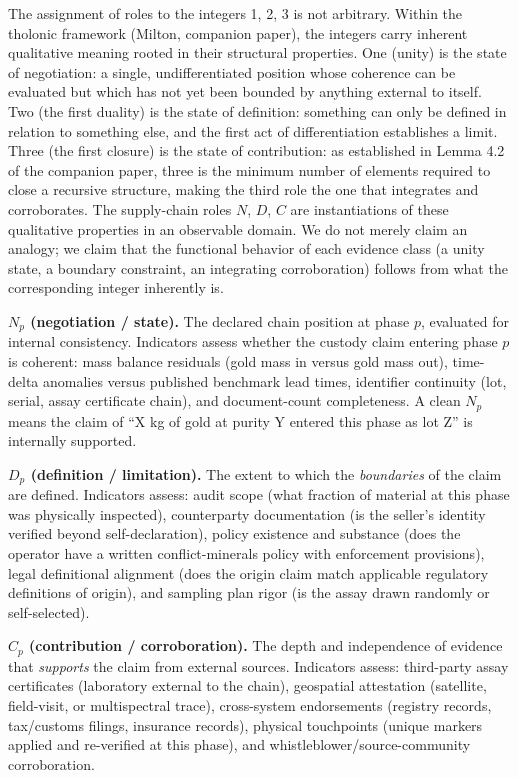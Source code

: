 \documentclass[
  11pt,
  letterpaper,
]{article}
\begin{document}
The assignment of roles to the integers 1, 2, 3 is not arbitrary. Within
the tholonic framework (Milton, companion paper), the integers carry
inherent qualitative meaning rooted in their structural properties. One
(unity) is the state of negotiation: a single, undifferentiated position
whose coherence can be evaluated but which has not yet been bounded by
anything external to itself. Two (the first duality) is the state of
definition: something can only be defined in relation to something else,
and the first act of differentiation establishes a limit. Three (the
first closure) is the state of contribution: as established in Lemma 4.2
of the companion paper, three is the minimum number of elements required
to close a recursive structure, making the third role the one that
integrates and corroborates. The supply-chain roles \(N\), \(D\), \(C\)
are instantiations of these qualitative properties in an observable
domain. We do not merely claim an analogy; we claim that the functional
behavior of each evidence class (a unity state, a boundary constraint,
an integrating corroboration) follows from what the corresponding
integer inherently is.

\textbf{\(N_p\) (negotiation / state).} The declared chain position at
phase \(p\), evaluated for internal consistency. Indicators assess
whether the custody claim entering phase \(p\) is coherent: mass balance
residuals (gold mass in versus gold mass out), time-delta anomalies
versus published benchmark lead times, identifier continuity (lot,
serial, assay certificate chain), and document-count completeness. A
clean \(N_p\) means the claim of ``X kg of gold at purity Y entered this
phase as lot Z'' is internally supported.

\textbf{\(D_p\) (definition / limitation).} The extent to which the
\emph{boundaries} of the claim are defined. Indicators assess: audit
scope (what fraction of material at this phase was physically
inspected), counterparty documentation (is the seller's identity
verified beyond self-declaration), policy existence and substance (does
the operator have a written conflict-minerals policy with enforcement
provisions), legal definitional alignment (does the origin claim match
applicable regulatory definitions of origin), and sampling plan rigor
(is the assay drawn randomly or self-selected).

\textbf{\(C_p\) (contribution / corroboration).} The depth and
independence of evidence that \emph{supports} the claim from external
sources. Indicators assess: third-party assay certificates (laboratory
external to the chain), geospatial attestation (satellite, field-visit,
or multispectral trace), cross-system endorsements (registry records,
tax/customs filings, insurance records), physical touchpoints (unique
markers applied and re-verified at this phase), and
whistleblower/source-community corroboration.
\end{document}
